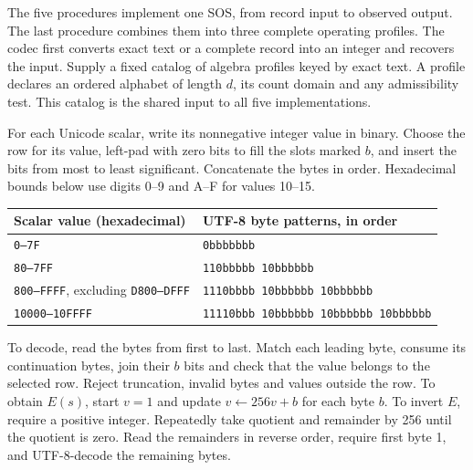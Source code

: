 \newcommand{\sosstep}[1]{\par\addvspace{3pt}\noindent{\sffamily\bfseries\color{tealref}#1}\enspace\ignorespaces}
\newcommand{\sosop}[1]{\textsf{#1}}
\label{sos-impl-one}
\begingroup\small\raggedright
The five procedures implement one SOS, from record input to observed output. The last procedure combines them into three complete operating profiles. The codec first converts exact text or a complete record into an integer and recovers the input. Supply a fixed catalog of algebra profiles keyed by exact text. A profile declares an ordered alphabet of length $d$, its count domain and any admissibility test. This catalog is the shared input to all five implementations.

\sosstep{Encode and decode text.}
For each Unicode scalar, write its nonnegative integer value in binary. Choose the row for its value, left-pad with zero bits to fill the slots marked $b$, and insert the bits from most to least significant. Concatenate the bytes in order. Hexadecimal bounds below use digits 0--9 and A--F for values 10--15.
\begin{center}\small
\begin{tabular}{@{}ll@{}}\toprule
Scalar value (hexadecimal) & UTF-8 byte patterns, in order\\\midrule
\texttt{0--7F} & \texttt{0bbbbbbb}\\
\texttt{80--7FF} & \texttt{110bbbbb 10bbbbbb}\\
\texttt{800--FFFF}, excluding \texttt{D800--DFFF} &
\texttt{1110bbbb 10bbbbbb 10bbbbbb}\\
\texttt{10000--10FFFF} & \texttt{11110bbb 10bbbbbb 10bbbbbb 10bbbbbb}\\\bottomrule
\end{tabular}\end{center}
To decode, read the bytes from first to last. Match each leading byte, consume its continuation bytes, join their $b$ bits and check that the value belongs to the selected row. Reject truncation, invalid bytes and values outside the row. To obtain $E(s)$, start $v=1$ and update $v\gets256v+b$ for each byte $b$. To invert $E$, require a positive integer. Repeatedly take quotient and remainder by 256 until the quotient is zero. Read the remainders in reverse order, require first byte 1, and UTF-8-decode the remaining bytes.

